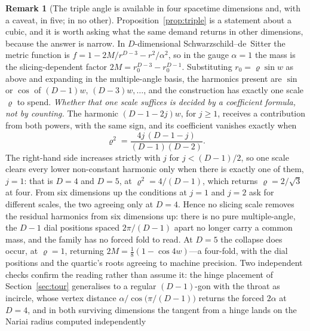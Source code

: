 \documentclass[11pt,a4paper]{article}
\theoremstyle{definition}
\newtheorem{remark}[theorem]{Remark}
\begin{document}
\begin{remark}[The triple angle is available in four spacetime dimensions and, with a caveat, in five; in no other]\label{rem:dimension}
Proposition~\ref{prop:triple} is a statement about a cubic, and it is worth asking what the same demand returns
in other dimensions, because the answer is narrow. In $D$-dimensional Schwarzschild--de~Sitter the metric
function is $f=1-2M/r^{D-3}-r^{2}/\alpha^{2}$, so in the gauge $\alpha=1$ the mass is the slicing-dependent
factor $2M=r_{0}^{D-3}-r_{0}^{D-1}$. Substituting $r_{0}=\varrho\sin w$ as above and expanding in the
multiple-angle basis, the harmonics present are $\sin$ or $\cos$ of $(D-1)w,\,(D-3)w,\ldots$, and the
construction has exactly one scale $\varrho$ to spend. \emph{Whether that one scale suffices is decided by a
coefficient formula, not by counting.} The harmonic $(D-1-2j)w$, for $j\ge1$, receives a contribution from both
powers, with the same sign, and its coefficient vanishes exactly when
\[
  \varrho^{2}=\frac{4j\,(D-1-j)}{(D-1)(D-2)} .
\]
The right-hand side increases strictly with $j$ for $j<(D-1)/2$, so one scale clears every lower non-constant
harmonic only when there is exactly one of them, $j=1$: that is $D=4$ and $D=5$, at $\varrho^{2}=4/(D-1)$, which
returns $\varrho=2/\sqrt3$ at four. From six dimensions up the conditions at $j=1$ and $j=2$ ask for different
scales, the two agreeing only at $D=4$.
Hence no slicing scale removes the residual harmonics from six dimensions up: there is no pure multiple-angle, the $D-1$ dial positions spaced
$2\pi/(D-1)$ apart no longer carry a common mass, and the family has no forced fold to read. At $D=5$ the
collapse does occur, at $\varrho=1$, returning $2M=\tfrac18(1-\cos 4w)$---a four-fold, with the dial positions
and the quartic's roots agreeing to machine precision. Two independent checks confirm the reading rather than
assume it: the hinge placement of Section~\ref{sec:tour} generalises to a regular $(D-1)$-gon with the throat
as incircle, whose vertex distance $\alpha/\cos\bigl(\pi/(D-1)\bigr)$ returns the forced $2\alpha$ at $D=4$,
and in both surviving dimensions the tangent from a hinge lands on the Nariai radius computed independently

\end{remark}
\end{document}
